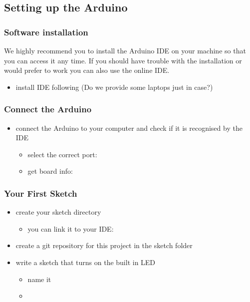 \subsection{Setting up the Arduino}\label{sec:setup}
\subsubsection{Software installation}
We highly recommend you to install the Arduino \ac{IDE} on your machine so that you can access it any time. If you should have trouble with the installation or would prefer to work you can also use the online \ac{IDE}.
\begin{itemize}
	\item install \ac{IDE} following  (Do we provide some laptops just in case?)
\end{itemize}

\subsubsection{Connect the Arduino}
\begin{itemize}
	\item connect the Arduino to your computer and check if it is recognised by the \ac{IDE}
	\begin{itemize}
		\item select the correct port: 
		\item get board info: 
	\end{itemize}
\end{itemize}

\subsubsection{Your First Sketch}
\begin{itemize}
	\item create your sketch directory
	\begin{itemize}
		\item you can link it to your \ac{IDE}: 
	\end{itemize}
	\item create a git repository for this project in the sketch folder
	\item write a sketch that turns on the built in LED 
	\begin{itemize}
		\item name it 
		\item {}
	\end{itemize}
\end{itemize}

